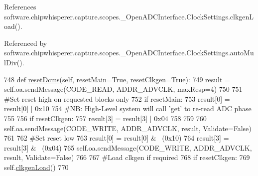 References software.\+chipwhisperer.\+capture.\+scopes.\+\_\+\+Open\+A\+D\+C\+Interface.\+Clock\+Settings.\+clkgen\+Load().



Referenced by software.\+chipwhisperer.\+capture.\+scopes.\+\_\+\+Open\+A\+D\+C\+Interface.\+Clock\+Settings.\+auto\+Mul\+Div().


\begin{DoxyCode}
748     \textcolor{keyword}{def }\hyperlink{classsoftware_1_1chipwhisperer_1_1capture_1_1scopes_1_1__OpenADCInterface_1_1ClockSettings_ac81b1c1353724814e4de7a6707d29a00}{resetDcms}(self, resetMain=True, resetClkgen=True):
749         result = self.oa.sendMessage(CODE\_READ, ADDR\_ADVCLK, maxResp=4)
750 
751         \textcolor{comment}{#Set reset high on requested blocks only}
752         \textcolor{keywordflow}{if} resetMain:
753             result[0] = result[0] | 0x10
754             \textcolor{comment}{#NB: High-Level system will call 'get' to re-read ADC phase}
755 
756         \textcolor{keywordflow}{if} resetClkgen:
757             result[3] = result[3] | 0x04
758 
759 
760         self.oa.sendMessage(CODE\_WRITE, ADDR\_ADVCLK, result, Validate=\textcolor{keyword}{False})
761 
762         \textcolor{comment}{#Set reset low}
763         result[0] = result[0] & ~(0x10)
764         result[3] = result[3] & ~(0x04)
765         self.oa.sendMessage(CODE\_WRITE, ADDR\_ADVCLK, result, Validate=\textcolor{keyword}{False})
766 
767         \textcolor{comment}{#Load clkgen if required}
768         \textcolor{keywordflow}{if} resetClkgen:
769             self.\hyperlink{classsoftware_1_1chipwhisperer_1_1capture_1_1scopes_1_1__OpenADCInterface_1_1ClockSettings_ad6bd783c9308e1b769dede3319a7e9f1}{clkgenLoad}()
770 
\end{DoxyCode}
\hypertarget{classsoftware_1_1chipwhisperer_1_1capture_1_1scopes_1_1__OpenADCInterface_1_1ClockSettings_a36a63656e5b6eb27d31a7bfe99acd7c9}{}
